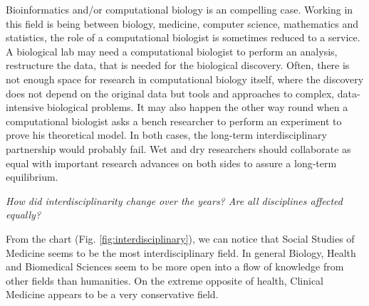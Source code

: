 \documentclass[12pt,]{book}
\theoremstyle{definition}
\theoremstyle{definition}
\theoremstyle{definition}
\theoremstyle{remark}
\begin{document}
Bioinformatics and/or computational biology is an compelling case.
Working in this field is being between biology, medicine, computer
science, mathematics and statistics, the role of a computational
biologist is sometimes reduced to a service. A biological lab may need a
computational biologist to perform an analysis, restructure the data,
that is needed for the biological discovery. Often, there is not enough
space for research in computational biology itself, where the discovery
does not depend on the original data but tools and approaches to
complex, data-intensive biological problems. It may also happen the
other way round when a computational biologist asks a bench researcher
to perform an experiment to prove his theoretical model. In both cases,
the long-term interdisciplinary partnership would probably fail. Wet and
dry researchers should collaborate as equal with important research
advances on both sides to assure a long-term equilibrium.

\emph{How did interdisciplinarity change over the years? Are all
disciplines affected equally?}

From the chart (Fig. \ref{fig:interdisciplinary}), we can notice that
Social Studies of Medicine seems to be the most interdisciplinary field.
In general Biology, Health and Biomedical Sciences seem to be more open
into a flow of knowledge from other fields than humanities. On the
extreme opposite of health, Clinical Medicine appears to be a very
conservative field.
\end{document}
